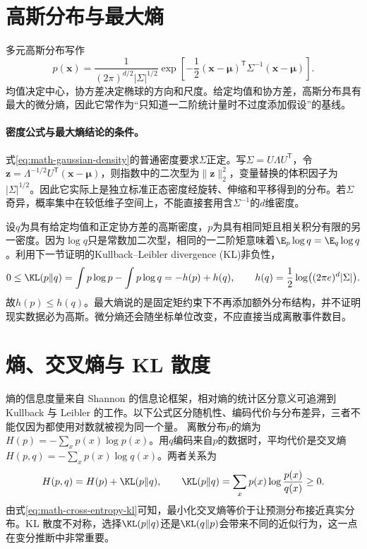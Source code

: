 \section{高斯分布与最大熵}
多元高斯分布写作
\begin{equation}
 p(\bm{x})=\frac{1}{(2\pi)^{d/2}|\Sigma|^{1/2}}
 \exp\left[-\frac12(\bm{x}-\bm{\mu})^{\mathsf T}\Sigma^{-1}(\bm{x}-\bm{\mu})\right].\label{eq:math-gaussian-density}
\end{equation}
均值决定中心，协方差决定椭球的方向和尺度。给定均值和协方差，高斯分布具有最大的微分熵，因此它常作为“只知道一二阶统计量时不过度添加假设”的基线。

\paragraph{密度公式与最大熵结论的条件。}
式\eqref{eq:math-gaussian-density}的普通密度要求$\Sigma$正定。写$\Sigma=U\Lambda U^{\mathsf T}$，令$\bm z=\Lambda^{-1/2}U^{\mathsf T}(\bm x-\bm\mu)$，则指数中的二次型为$\|\bm z\|_2^2$，变量替换的体积因子为$|\Sigma|^{1/2}$。因此它实际上是独立标准正态密度经旋转、伸缩和平移得到的分布。若$\Sigma$奇异，概率集中在较低维子空间上，不能直接套用含$\Sigma^{-1}$的$d$维密度。

设$q$为具有给定均值和正定协方差的高斯密度，$p$为具有相同矩且相关积分有限的另一密度。因为$\log q$只是常数加二次型，相同的一二阶矩意味着$\E_p\log q=\E_q\log q$。利用下一节证明的Kullback--Leibler divergence (KL)非负性，
\begin{equation}
 0\leq\KL(p\|q)=\int p\log p-\int p\log q
 =-h(p)+h(q),\qquad
 h(q)=\frac12\log\bigl((2\pi e)^d|\Sigma|\bigr).
\end{equation}
故$h(p)\leq h(q)$。最大熵说的是固定矩约束下不再添加额外分布结构，并不证明现实数据必为高斯。微分熵还会随坐标单位改变，不应直接当成离散事件数目。

\section{熵、交叉熵与 KL 散度}
熵的信息度量来自 Shannon 的信息论框架，相对熵的统计区分意义可追溯到 Kullback 与 Leibler 的工作\cite{shannon1948information,kullback1951information}。以下公式区分随机性、编码代价与分布差异，三者不能仅因为都使用对数就被视为同一个量。
离散分布$p$的熵为$H(p)=-\sum_xp(x)\log p(x)$。用$q$编码来自$p$的数据时，平均代价是交叉熵$H(p,q)=-\sum_xp(x)\log q(x)$。两者关系为
\begin{equation}
 H(p,q)=H(p)+\KL(p\|q),
 \qquad \KL(p\|q)=\sum_xp(x)\log\frac{p(x)}{q(x)}\geq0.\label{eq:math-cross-entropy-kl}
\end{equation}
由式\eqref{eq:math-cross-entropy-kl}可知，最小化交叉熵等价于让预测分布接近真实分布。KL 散度不对称，选择$\KL(p\|q)$还是$\KL(q\|p)$会带来不同的近似行为，这一点在变分推断中非常重要。

